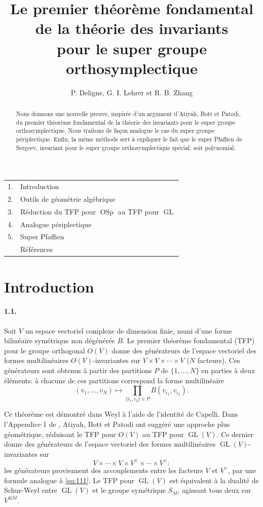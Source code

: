 \documentclass[11pt]{article}
\title{Le premier théorème fondamental de la théorie des invariants\\pour le super groupe orthosymplectique}
\author{P. Deligne, G. I. Lehrer et R. B. Zhang}
\date{}
\newcommand{\GL}{\operatorname{GL}}
\newcommand{\OSp}{\operatorname{OSp}}
\begin{document}
\maketitle
\begin{abstract}
Nous donnons une nouvelle preuve, inspirée d'un argument d'Atiyah, Bott et Patodi, du premier théorème fondamental de la théorie des invariants pour le super groupe orthosymplectique. Nous traitons de façon analogue le cas du super groupe périplectique. Enfin, la même méthode sert à expliquer le fait que le super Pfaffien de Sergeev, invariant pour le super groupe orthosymplectique spécial, soit polynomial.
\end{abstract}

\begin{center}
\begin{tabular}{rl}
1. & Introduction\\
2. & Outils de géométrie algébrique\\
3. & Réduction du TFP pour $\OSp$ au TFP pour $\GL$\\
4. & Analogue périplectique\\
5. & Super Pfaffien\\
& Références
\end{tabular}
\end{center}

\section{Introduction}

\paragraph{1.1.}
Soit $V$ un espace vectoriel complexe de dimension finie, muni d'une forme bilinéaire symétrique non dégénérée $B$. Le premier théorème fondamental (TFP) pour le groupe orthogonal $O(V)$ donne des générateurs de l'espace vectoriel des formes multilinéaires $O(V)$-invariantes sur $V\times V\times\cdots\times V$ ($N$ facteurs). Ces générateurs sont obtenus à partir des partitions $P$ de $\{1,\ldots,N\}$ en parties à deux éléments: à chacune de ces partitions correspond la forme multilinéaire
\begin{equation}
\label{eq:111}
(v_1,\ldots,v_N)\longmapsto \prod_{\{i_1,i_2\}\in P} B(v_{i_1},v_{i_2}).
\end{equation}

Ce théorème est démontré dans Weyl \cite{Weyl46} à l'aide de l'identité de Capelli. Dans l'Appendice 1 de \cite{ABP73}, Atiyah, Bott et Patodi ont suggéré une approche plus géométrique, réduisant le TFP pour $O(V)$ au TFP pour $\GL(V)$. Ce dernier donne des générateurs de l'espace vectoriel des formes multilinéaires $\GL(V)$-invariantes sur
\[
V\times\cdots\times V\times V^\vee\times\cdots\times V^\vee:
\]
les générateurs proviennent des accouplements entre les facteurs $V$ et $V^\vee$, par une formule analogue à \eqref{eq:111}. Le TFP pour $\GL(V)$ est équivalent à la dualité de Schur-Weyl entre $\GL(V)$ et le groupe symétrique $S_M$, agissant tous deux sur $V^{\otimes M}$.
\end{document}

